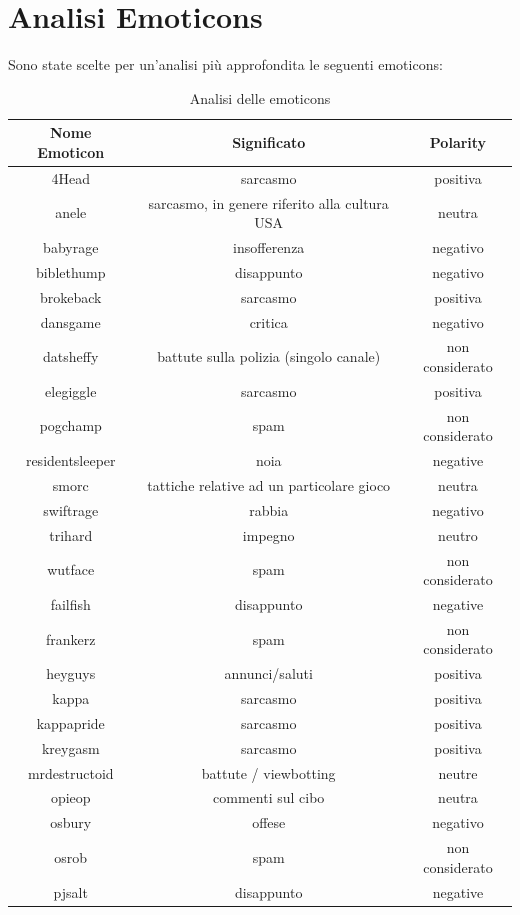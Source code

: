 \documentclass[a4paper,12pt,openright,twoside]{report}
\theoremstyle{definition}
\begin{document}
\section{Analisi Emoticons}
Sono state scelte per un'analisi più approfondita le seguenti emoticons:
\begin{table}[h]
\begin{center}
\begin{tabular}{|c|c|c|}
\hline
Nome Emoticon & Significato & Polarity \\
\hline
\hline
4Head & sarcasmo & positiva \\
\hline
anele & sarcasmo, in genere riferito alla cultura USA & neutra \\
\hline
babyrage & insofferenza & negativo \\
\hline
biblethump & disappunto & negativo \\
\hline
brokeback & sarcasmo & positiva \\
\hline
dansgame & critica & negativo \\
\hline
datsheffy & battute sulla polizia (singolo canale) & non considerato \\
\hline
elegiggle & sarcasmo & positiva \\
\hline
pogchamp & spam & non considerato \\
\hline
residentsleeper & noia & negative \\
\hline
smorc & tattiche relative ad un particolare gioco & neutra \\
\hline
swiftrage & rabbia & negativo \\
\hline
trihard & impegno &  neutro \\
\hline
wutface & spam & non considerato \\
\hline
failfish & disappunto & negative \\
\hline
frankerz & spam & non considerato \\
\hline
heyguys & annunci/saluti & positiva \\
\hline
kappa & sarcasmo & positiva \\
\hline
kappapride & sarcasmo & positiva \\
\hline
kreygasm & sarcasmo & positiva \\
\hline
mrdestructoid & battute / viewbotting & neutre \\
\hline
opieop & commenti sul cibo & neutra \\
\hline
osbury & offese & negativo \\
\hline
osrob & spam & non considerato \\
\hline
pjsalt & disappunto & negative \\
\hline
\end{tabular}
\end{center}
\caption{Analisi delle emoticons}
\label{tab:emoticons1}
\end{table}
\end{document}
